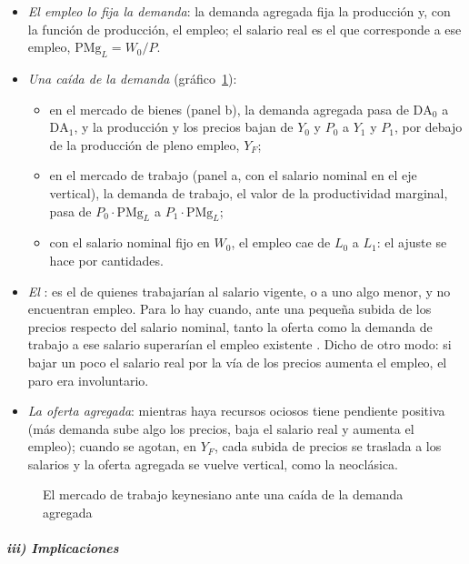 \documentclass[11pt]{article}
\begin{document}
\begin{itemize}
\item \emph{El empleo lo fija la demanda}: la demanda agregada fija la producción y, con la función de producción, el empleo; el salario real es el que corresponde a ese empleo, $\mathrm{PMg}_L=W_0/P$.
\item \emph{Una caída de la demanda} (gráfico~\ref{fig:keynesiano-shock}):
  \begin{itemize}
  \item en el mercado de bienes (panel b), la demanda agregada pasa de $\mathrm{DA}_0$ a $\mathrm{DA}_1$, y la producción y los precios bajan de $Y_0$ y $P_0$ a $Y_1$ y $P_1$, por debajo de la producción de pleno empleo, $Y_F$;
  \item en el mercado de trabajo (panel a, con el salario nominal en el eje vertical), la demanda de trabajo, el valor de la productividad marginal, pasa de $P_0\cdot\mathrm{PMg}_L$ a $P_1\cdot\mathrm{PMg}_L$;
  \item con el salario nominal fijo en $W_0$, el empleo cae de $L_0$ a $L_1$: el ajuste se hace por cantidades.
  \end{itemize}
\item \emph{El }: es el de quienes trabajarían al salario vigente, o a uno algo menor, y no encuentran empleo. Para  lo hay cuando, ante una pequeña subida de los precios respecto del salario nominal, tanto la oferta como la demanda de trabajo a ese salario superarían el empleo existente\nocite{Keynes1936} . Dicho de otro modo: si bajar un poco el salario real por la vía de los precios aumenta el empleo, el paro era involuntario.
\item \emph{La oferta agregada}: mientras haya recursos ociosos tiene pendiente positiva (más demanda sube algo los precios, baja el salario real y aumenta el empleo); cuando se agotan, en $Y_F$, cada subida de precios se traslada a los salarios y la oferta agregada se vuelve vertical, como la neoclásica.
\end{itemize}

\begin{figure}[H]
\centering
\caption{El mercado de trabajo keynesiano ante una caída de la demanda agregada}\label{fig:keynesiano-shock}
\end{figure}

\subparagraph{iii) Implicaciones}
\end{document}
